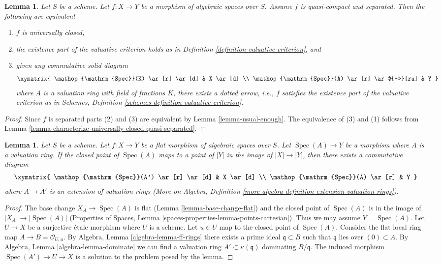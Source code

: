 \documentclass{stacks-project}
\theoremstyle{plain}
\newtheorem{lemma}[subsection]{Lemma}
\theoremstyle{definition}
\theoremstyle{remark}
\numberwithin{equation}{subsection}
\def\Spec{\mathop{\mathrm{Spec}}}
\begin{document}
\begin{lemma}
\label{lemma-characterize-universally-closed-separated}
Let $S$ be a scheme. Let $f : X \to Y$ be a morphism of algebraic spaces
over $S$. Assume $f$ is quasi-compact and separated. Then the following
are equivalent
\begin{enumerate}
\item $f$ is universally closed,
\item the existence part of the valuative criterion holds
as in Definition \ref{definition-valuative-criterion}, and
\item given any commutative solid diagram
$$
\xymatrix{
\Spec(K) \ar[r] \ar[d] & X \ar[d] \\
\Spec(A) \ar[r] \ar@{-->}[ru] & Y
}
$$
where $A$ is a valuation ring with field of fractions $K$, there exists
a dotted arrow, i.e., $f$ satisfies the existence part of the valuative
criterion as in
Schemes, Definition \ref{schemes-definition-valuative-criterion}.
\end{enumerate}
\end{lemma}

\begin{proof}
Since $f$ is separated parts (2) and (3) are equivalent by
Lemma \ref{lemma-usual-enough}.
The equivalence of (3) and (1) follows from
Lemma \ref{lemma-characterize-universally-closed-quasi-separated}.
\end{proof}

\begin{lemma}
\label{lemma-lift-valuation-ring-through-flat-morphism}
Let $S$ be a scheme. Let $f : X \to Y$ be a flat morphism
of algebraic spaces over $S$.
Let $\Spec(A) \to Y$ be a morphism where $A$ is a
valuation ring. If the closed point of $\Spec(A)$ maps to a
point of $|Y|$ in the image of $|X| \to |Y|$, then there exists
a commutative diagram
$$
\xymatrix{
\Spec(A') \ar[r] \ar[d] & X \ar[d] \\
\Spec(A) \ar[r] & Y
}
$$
where $A \to A'$ is an extension of valuation rings
(More on Algebra, Definition
\ref{more-algebra-definition-extension-valuation-rings}).
\end{lemma}

\begin{proof}
The base change $X_A \to \Spec(A)$ is flat
(Lemma \ref{lemma-base-change-flat}) and the closed point of
$\Spec(A)$ is in the image of $|X_A| \to |\Spec(A)|$
(Properties of Spaces, Lemma \ref{spaces-properties-lemma-points-cartesian}).
Thus we may assume $Y = \Spec(A)$. Let $U \to X$ be a surjective
\'etale morphism where $U$ is a scheme. Let $u \in U$ map to
the closed point of $\Spec(A)$. Consider the flat local ring map
$A \to B = \mathcal{O}_{U, u}$. By
Algebra, Lemma \ref{algebra-lemma-ff-rings}
there exists a prime ideal $\mathfrak q \subset B$ such that
$\mathfrak q$ lies over $(0) \subset A$. By
Algebra, Lemma \ref{algebra-lemma-dominate}
we can find a valuation ring $A' \subset \kappa(\mathfrak q)$
dominating $B/\mathfrak q$. The induced morphism
$\Spec(A') \to U \to X$ is a solution to the problem
posed by the lemma.
\end{proof}
\end{document}
